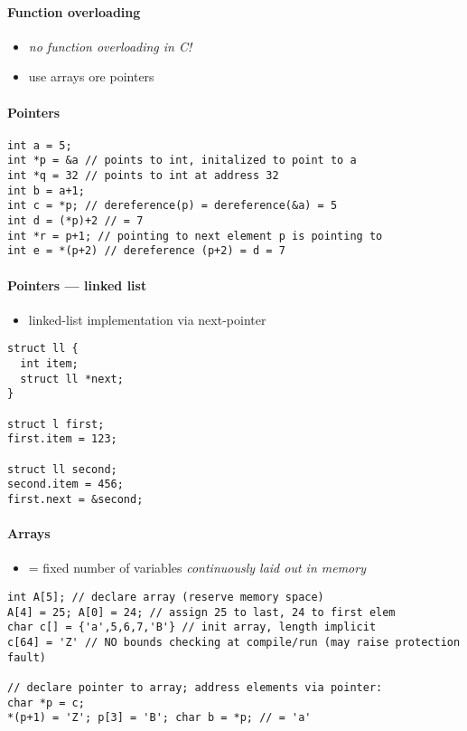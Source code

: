 \paragraph{Function overloading}
\begin{itemize}
  \item \emph{no function overloading in C!}
  \item use arrays ore pointers
\end{itemize}

\paragraph{Pointers}
\begin{lstlisting}[style=customc]
int a = 5;
int *p = &a // points to int, initalized to point to a
int *q = 32 // points to int at address 32
int b = a+1;
int c = *p; // dereference(p) = dereference(&a) = 5
int d = (*p)+2 // = 7
int *r = p+1; // pointing to next element p is pointing to
int e = *(p+2) // dereference (p+2) = d = 7
\end{lstlisting}

\paragraph{Pointers --- linked list}
\begin{itemize}
  \item linked-list implementation via next-pointer
\end{itemize}
\begin{lstlisting}[style=customc]
struct ll {
  int item;
  struct ll *next;
}

struct l first;
first.item = 123;

struct ll second;
second.item = 456;
first.next = &second;
\end{lstlisting}

\paragraph{Arrays}
\begin{itemize}
  \item = fixed number of variables \emph{continuously laid out in memory}
\end{itemize}
\begin{lstlisting}[style=customc]
int A[5]; // declare array (reserve memory space)
A[4] = 25; A[0] = 24; // assign 25 to last, 24 to first elem
char c[] = {'a',5,6,7,'B'} // init array, length implicit
c[64] = 'Z' // NO bounds checking at compile/run (may raise protection fault)

// declare pointer to array; address elements via pointer:
char *p = c;
*(p+1) = 'Z'; p[3] = 'B'; char b = *p; // = 'a'
\end{lstlisting}


